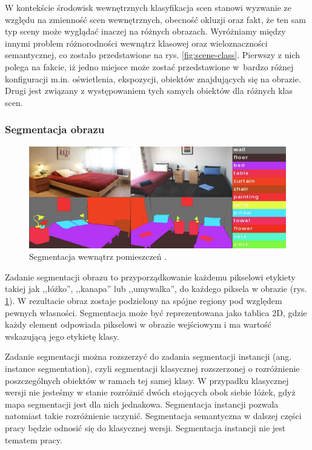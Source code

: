 W kontekście środowisk wewnętrznych klasyfikacja scen stanowi wyzwanie ze względu na zmienność scen wewnętrznych, obecność okluzji oraz fakt, że ten sam typ sceny może wyglądać inaczej na różnych obrazach. Wyróżniamy między innymi problem różnorodności wewnątrz klasowej oraz wieloznaczności semantycznej, co zostało przedstawione na rys. \ref{fig:scene-class}. Pierwszy z nich polega na fakcie, iż jedno miejsce może zostać przedstawione w~bardzo różnej konfiguracji m.in. oświetlenia, ekspozycji, obiektów znajdujących się na obrazie. Drugi jest związany z występowaniem tych samych obiektów dla różnych klas scen.

\subsubsection{Segmentacja obrazu}
\begin{figure}[ht!]
    \includegraphics[width=\textwidth]{img/segment.png}
    \caption{Segmentacja wewnątrz pomieszczeń \cite{zhang2018context}.}
    \label{fig:segment}
  \end{figure}
  
Zadanie segmentacji obrazu to przyporządkowanie każdemu pikselowi etykiety takiej jak ,,łóżko'', ,,kanapa'' lub ,,umywalka'', do każdego piksela w obrazie (rys. \ref{fig:segment}). W rezultacie obraz zostaje podzielony na spójne regiony pod względem pewnych własności. Segmentacja może być reprezentowana jako tablica 2D, gdzie każdy element odpowiada pikselowi w obrazie wejściowym i ma wartość wskazującą jego etykietę klasy.

Zadanie segmentacji można rozszerzyć do zadania segmentacji instancji (ang. instance segmentation), czyli segmentacji klasycznej rozszerzonej o rozróżnienie poszczególnych obiektów w ramach tej samej klasy. W przypadku klasycznej wersji nie jesteśmy w stanie rozróżnić dwóch stojących obok siebie łóżek, gdyż mapa segmentacji jest dla nich jednakowa. Segmentacja instancji pozwala natomiast takie rozróżnienie uczynić. Segmentacja semantyczna w dalszej części pracy będzie odnosić się do klasycznej wersji. Segmentacja instancji nie jest tematem pracy.

